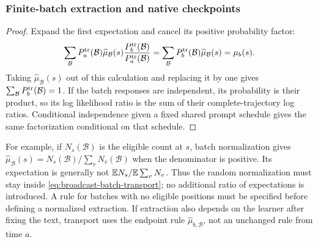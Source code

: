 \subsubsection{Finite-batch extraction and native checkpoints}
\label{app:broadcast-source-conventions}
\begin{proof}
Expand the first expectation and cancel its positive probability factor:
\[
 \sum_{\mathcal B}P_a^{\rm tr}(\mathcal B)
 \widehat\mu_{\mathcal B}(s)\frac{P_b^{\rm tr}(\mathcal B)}{P_a^{\rm tr}(\mathcal B)}
 =\sum_{\mathcal B}P_b^{\rm tr}(\mathcal B)\widehat\mu_{\mathcal B}(s)=\mu_b(s).
\]
Taking $\widehat\mu_{\mathcal B}(s)$ out of this calculation and replacing it by one gives $\sum_{\mathcal B}P_b^{\rm tr}(\mathcal B)=1$. If the batch responses are independent, its probability is their product, so its log likelihood ratio is the sum of their complete-trajectory log ratios. Conditional independence given a fixed shared prompt schedule gives the same factorization conditional on that schedule.
\end{proof}

For example, if $N_s(\mathcal B)$ is the eligible count at $s$, batch normalization gives $\widehat\mu_{\mathcal B}(s)=N_s(\mathcal B)/\sum_vN_v(\mathcal B)$ when the denominator is positive. Its expectation is generally not $\mathbb{E} N_s/\mathbb{E}\sum_vN_v$. Thus the random normalization must stay inside \cref{eq:broadcast-batch-transport}; no additional ratio of expectations is introduced. A rule for batches with no eligible positions must be specified before defining a normalized extraction. If extraction also depends on the learner after fixing the text, transport uses the endpoint rule $\widehat\mu_{b,\mathcal B}$, not an unchanged rule from time $a$.

